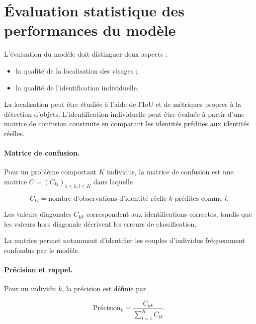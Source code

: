 \documentclass[11pt,a4paper]{report}
\begin{document}
\section{Évaluation statistique des performances du modèle}
\label{sec:eval-theorie}

L'évaluation du modèle doit distinguer deux aspects :

\begin{itemize}
    \item la qualité de la localisation des visages ;
    \item la qualité de l'identification individuelle.
\end{itemize}

La localisation peut être étudiée à l'aide de l'IoU et de métriques propres à
la détection d'objets. L'identification individuelle peut être évaluée à partir
d'une matrice de confusion construite en comparant les identités prédites aux
identités réelles.

\paragraph{Matrice de confusion.}

Pour un problème comportant $K$ individus, la matrice de confusion est une
matrice $C=(C_{kl})_{1\leq k,l\leq K}$ dans laquelle

\begin{equation}
    C_{kl}
    =
    \text{nombre d'observations d'identité réelle $k$ prédites comme $l$}.
\end{equation}

Les valeurs diagonales $C_{kk}$ correspondent aux identifications correctes,
tandis que les valeurs hors diagonale décrivent les erreurs de classification.

La matrice permet notamment d'identifier les couples d'individus fréquemment
confondus par le modèle.

\paragraph{Précision et rappel.}

Pour un individu $k$, la précision est définie par

\begin{equation}
    \text{Précision}_k
    =
    \frac{C_{kk}}
    {\displaystyle\sum_{l=1}^{K} C_{lk}}.
    \label{eq:precision}
\end{equation}
\end{document}
